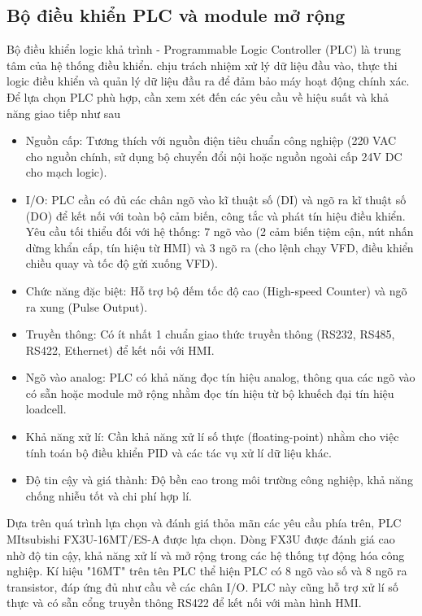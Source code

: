           \subsection{Bộ điều khiển PLC và module mở rộng}
               \hspace*{0.6cm}Bộ điều khiển logic khả trình - Programmable Logic Controller (PLC) là trung tâm của hệ thống điều khiển. chịu trách nhiệm xử lý dữ liệu đầu vào, thực thi logic điều khiển và quản lý dữ liệu đầu ra để đảm bảo máy hoạt động chính xác. Để lựa chọn PLC phù hợp, cần xem xét đến các yêu cầu về hiệu suất và khả năng giao tiếp như sau
               \begin{itemize}
                    \item Nguồn cấp: Tương thích với nguồn điện tiêu chuẩn công nghiệp (220 VAC cho nguồn chính, sử dụng bộ chuyển đổi nội hoặc nguồn ngoài cấp 24V DC cho mạch logic).
                    \item I/O: PLC cần có đủ các chân ngõ vào kĩ thuật số (DI) và ngõ ra kĩ thuật số (DO) để kết nối với toàn bộ cảm biến, công tắc và phát tín hiệu điều khiển. Yêu cầu tối thiểu đối với hệ thống: 7 ngõ vào (2 cảm biến tiệm cận, nút nhấn dừng khẩn cấp, tín hiệu từ HMI) và 3 ngõ ra (cho lệnh chạy VFD, điều khiển chiều quay và tốc độ gửi xuống VFD).
                    \item Chức năng đặc biệt: Hỗ trợ bộ đếm tốc độ cao (High-speed Counter) và ngõ ra xung (Pulse Output).
                    \item Truyền thông: Có ít nhất 1 chuẩn giao thức truyền thông (RS232, RS485, RS422, Ethernet) để kết nối với HMI.
                    \item Ngõ vào analog: PLC có khả năng đọc tín hiệu analog, thông qua các ngõ vào có sẵn hoặc module mở rộng nhằm đọc tín hiệu từ bộ khuếch đại tín hiệu loadcell.
                    \item Khả năng xử lí: Cần khả năng xử lí số thực (floating-point) nhằm cho việc tính toán bộ điều khiển PID và các tác vụ xử lí dữ liệu khác.
                    \item Độ tin cậy và giá thành: Độ bền cao trong môi trường công nghiệp, khả năng chống nhiễu tốt và chi phí hợp lí.
               \end{itemize}
               \hspace*{0.6cm}Dựa trên quá trình lựa chọn và đánh giá thỏa mãn các yêu cầu phía trên, PLC MItsubishi FX3U-16MT/ES-A được lựa chọn. Dòng FX3U được đánh giá cao nhờ độ tin cậy, khả năng xử lí và mở rộng trong các hệ thống tự động hóa công nghiệp. Kí hiệu "16MT" trên tên PLC thể hiện PLC có 8 ngõ vào số và 8 ngõ ra transistor, đáp ứng đủ như cầu về các chân I/O. PLC này cũng hỗ trợ xử lí số thực và có sẵn cổng truyền thông RS422 để kết nối với màn hình HMI.
